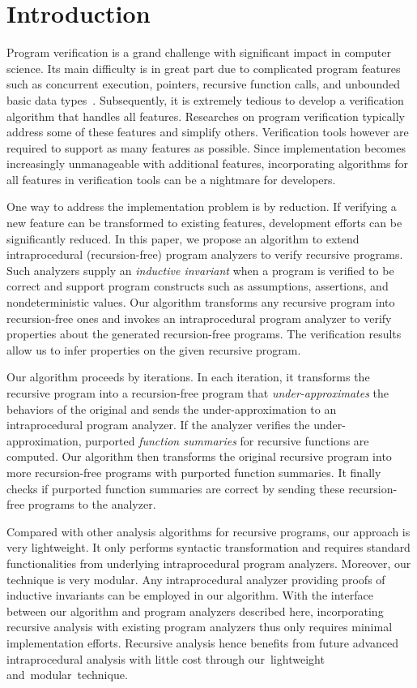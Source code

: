 
\chapter{Introduction}\label{ch:introduction}

Program verification is a grand challenge with significant impact in computer science.
Its main difficulty is in great part due to complicated program features such as concurrent execution,  pointers,  recursive function calls,  and unbounded basic data types~\cite{ClarkeJS05}. Subsequently, it is extremely tedious to develop a verification algorithm that handles all features. Researches on program verification typically address some of these features and simplify others. Verification tools however are required to support as many features as possible. Since implementation becomes increasingly unmanageable with additional features, incorporating algorithms for all features in verification tools can be a nightmare for developers.

One way to address the implementation problem is by reduction. If verifying a new feature can be transformed to existing features, development efforts can be significantly reduced.
In this paper, we propose an algorithm to extend intraprocedural (recursion-free) program analyzers to verify recursive programs. Such analyzers supply an \emph{inductive invariant} when a program is verified to be correct and support program constructs such as assumptions, assertions, and nondeterministic values. Our algorithm transforms any recursive program into recursion-free ones and invokes an intraprocedural program analyzer to verify properties about the generated recursion-free programs. The verification results allow us to infer properties on the given recursive program.

Our algorithm proceeds by iterations. In each iteration, it transforms the recursive program into a recursion-free program that \emph{under-approximates} the behaviors of the original and sends the under-approximation to an intraprocedural program analyzer. If the analyzer verifies the under-approximation, purported \emph{function summaries} for recursive functions are computed. Our algorithm then transforms the original recursive program into more recursion-free programs with purported function summaries. It finally checks if purported function summaries are correct by sending these recursion-free programs to the analyzer.

Compared with other analysis algorithms for recursive programs, our approach is very lightweight. It only performs syntactic transformation and requires standard functionalities from underlying intraprocedural program analyzers. Moreover, our technique is very modular. Any intraprocedural analyzer providing proofs of inductive invariants can be employed in our algorithm. With the interface between our algorithm and program analyzers described here, incorporating recursive analysis with existing program analyzers thus only requires minimal implementation efforts. Recursive analysis hence benefits from future advanced intraprocedural analysis with little cost through our~lightweight and~modular~technique.

